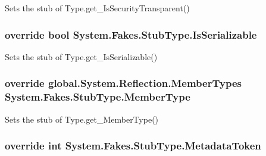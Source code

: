 Sets the stub of Type.\-get\-\_\-\-Is\-Security\-Transparent()

\hypertarget{class_system_1_1_fakes_1_1_stub_type_a797e93ff16f929a0feff1944ceac0b1c}{
\subsubsection[{Is\-Serializable}]{\setlength{\rightskip}{0pt plus 5cm}override bool System.\-Fakes.\-Stub\-Type.\-Is\-Serializable\hspace{0.3cm}{\ttfamily [get]}}}\label{class_system_1_1_fakes_1_1_stub_type_a797e93ff16f929a0feff1944ceac0b1c}


Sets the stub of Type.\-get\-\_\-\-Is\-Serializable()

\hypertarget{class_system_1_1_fakes_1_1_stub_type_ab5d48e1f186d267e813c593a678b5ca7}{
\subsubsection[{Member\-Type}]{\setlength{\rightskip}{0pt plus 5cm}override global.\-System.\-Reflection.\-Member\-Types System.\-Fakes.\-Stub\-Type.\-Member\-Type\hspace{0.3cm}{\ttfamily [get]}}}\label{class_system_1_1_fakes_1_1_stub_type_ab5d48e1f186d267e813c593a678b5ca7}


Sets the stub of Type.\-get\-\_\-\-Member\-Type()

\hypertarget{class_system_1_1_fakes_1_1_stub_type_a4303634bd00e2c477fa330e8e1af4606}{
\subsubsection[{Metadata\-Token}]{\setlength{\rightskip}{0pt plus 5cm}override int System.\-Fakes.\-Stub\-Type.\-Metadata\-Token\hspace{0.3cm}{\ttfamily [get]}}}\label{class_system_1_1_fakes_1_1_stub_type_a4303634bd00e2c477fa330e8e1af4606}


